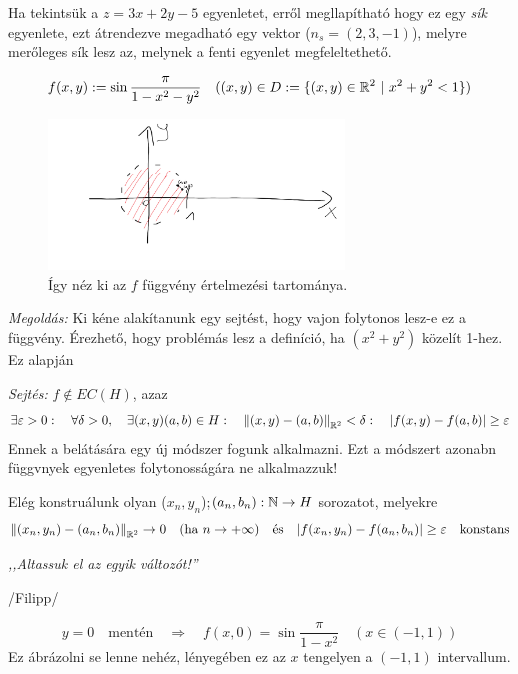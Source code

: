 \documentclass[a4paper,11.5pt]{article}
\newcommand{\norm}[1]{\left\lVert#1\right\rVert}
\begin{document}
	\begin{note}
		Ha tekintsük a $z=3x+2y-5$ egyenletet, erről megllapítható hogy ez egy \textit{sík} egyenlete, ezt átrendezve megadható egy vektor ($n_s=(2,3,-1)$), melyre merőleges sík lesz az, melynek a fenti egyenlet megfeleltethető.
	\end{note}
	\begin{task}
		\[ f(x,y):=\sin\frac{\pi}{1-x^2-y^2} \quad ((x,y)\in D:=\{ (x,y)\in\mathbb{R}^2 \ | \ x^2+y^2<1 \}) \]
		
		
		\begin{figure}[H]
			\centering
			\includegraphics[height=4cm]{../2zh/kepek/53.png}
			\caption{Így néz ki az $f$ függvény értelmezési tartománya.}
		\end{figure}
		
		
		\textit{Megoldás:} Ki kéne alakítanunk egy sejtést, hogy vajon folytonos lesz-e ez a függvény. Érezhető, hogy problémás lesz a definíció, ha $(x^2+y^2)$ közelít 1-hez. Ez alapján
		
		\textit{Sejtés:} $f\notin EC(H)$, azaz
		\[ \exists\varepsilon>0:\quad \forall\delta>0,\quad \exists(x,y)(a,b)\in H:\quad \norm{(x,y)-(a,b)}_{\R^2}<\delta:\quad |f(x,y)-f(a,b)|\geq \varepsilon  \]
		Ennek a belátására egy új módszer fogunk alkalmazni. Ezt a módszert azonabn függvnyek egyenletes folytonosságára ne alkalmazzuk!
		
		Elég konstruálunk olyan ($x_n,y_n$);$(a_n,b_n):\mathbb{N}\to H$ sorozatot, melyekre
		\[ \norm{(x_n,y_n)-(a_n,b_n)}_{\R^2}\to0\quad (\text{ha } n\to+\infty)\quad \text{és}\quad |f(x_n,y_n)-f(a_n,b_n)|\geq \varepsilon\quad \text{konstans} \] 
		\begin{center}
			\textit{,,Altassuk el az egyik változót!''}
			
			/Filipp/
		\end{center}
		\[ y=0\quad \text{mentén}\quad \Rightarrow\quad f(x,0)=\sin\frac{\pi}{1-x^2}\quad (x\in(-1,1)) \]
		Ez ábrázolni se lenne nehéz, lényegében ez az $x$ tengelyen a $(-1,1)$ intervallum.
		

\end{task}
\end{document}
